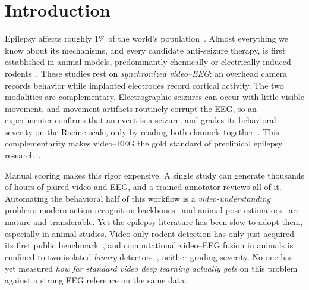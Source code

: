 \label{fig:pipeline}

\section{Introduction}
\label{sec:intro}

Epilepsy affects roughly 1\% of the world's population~\cite{liu2026}. Almost
everything we know about its mechanisms, and every candidate anti-seizure
therapy, is first established in animal models, predominantly chemically or
electrically induced rodents~\cite{bhatt2021}. These studies rest on
\emph{synchronized video--EEG}: an overhead camera records behavior while
implanted electrodes record cortical activity. The two modalities are
complementary. Electrographic seizures can occur with little visible movement,
and movement artifacts routinely corrupt the EEG, so an experimenter confirms
that an event is a seizure, and grades its behavioral severity on the Racine
scale, only by reading both channels together~\cite{racine1972, lundt2015}. This
complementarity makes video--EEG the gold standard of preclinical epilepsy
research~\cite{bhatt2021}.

Manual scoring makes this rigor expensive. A single study can generate thousands
of hours of paired video and EEG, and a trained annotator reviews all of it.
Automating the behavioral half of this workflow is a \emph{video-understanding}
problem: modern action-recognition
backbones~\cite{carreira2017i3d,tran2018r2plus1d,feichtenhofer2019slowfast} and
animal pose estimators~\cite{mathis2018deeplabcut,pereira2022sleap} are mature
and transferable. Yet the epilepsy literature has been slow to adopt them,
especially in animal studies. Video-only rodent detection has only just acquired
its first public benchmark~\cite{rodepil2025}, and computational video--EEG
fusion in animals is confined to two isolated \emph{binary}
detectors~\cite{mullen2024,eegvfusion2026}, neither grading severity. No one has yet measured \emph{how far standard video deep learning actually gets}
on this problem against a strong EEG reference on the same data.

